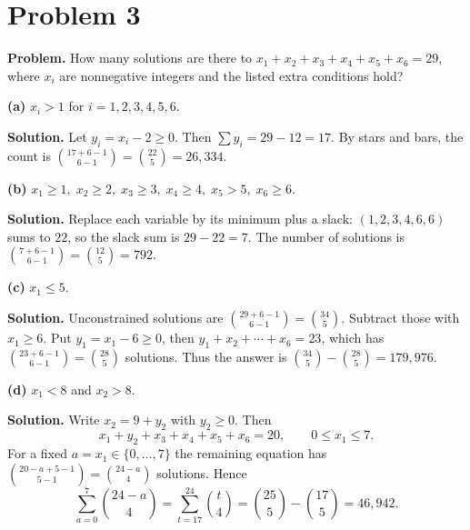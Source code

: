 \section*{Problem 3}
\textbf{Problem.} How many solutions are there to
\(x_1+x_2+x_3+x_4+x_5+x_6=29\),
where \(x_i\) are nonnegative integers and the listed extra conditions hold?

\medskip
\textbf{(a)} \(x_i>1\) for \(i=1,2,3,4,5,6\).

\textbf{Solution.}
Let \(y_i=x_i-2\ge 0\). Then \(\sum y_i=29-12=17\).
By stars and bars, the count is
\(\binom{17+6-1}{6-1}=\boxed{\binom{22}{5}=26{,}334}\).

\medskip
\textbf{(b)} \(x_1\ge 1,\;x_2\ge 2,\;x_3\ge 3,\;x_4\ge 4,\;x_5>5,\;x_6\ge 6.\)

\textbf{Solution.}
Replace each variable by its minimum plus a slack:
\((1,2,3,4,6,6)\) sums to \(22\), so the slack sum is \(29-22=7\).
The number of solutions is
\(\binom{7+6-1}{6-1}=\boxed{\binom{12}{5}=792}\).

\medskip
\textbf{(c)} \(x_1\le 5\).

\textbf{Solution.}
Unconstrained solutions are \(\binom{29+6-1}{6-1}=\binom{34}{5}\).
Subtract those with \(x_1\ge 6\). Put \(y_1=x_1-6\ge 0\), then
\(y_1+x_2+\cdots+x_6=23\), which has \(\binom{23+6-1}{6-1}=\binom{28}{5}\) solutions.
Thus the answer is
\(\boxed{\binom{34}{5}-\binom{28}{5}=179{,}976}\).

\medskip
\textbf{(d)} \(x_1<8\) and \(x_2>8\).

\textbf{Solution.}
Write \(x_2=9+y_2\) with \(y_2\ge 0\). Then
\[
x_1+y_2+x_3+x_4+x_5+x_6=20,\qquad 0\le x_1\le 7.
\]
For a fixed \(a=x_1\in\{0,\dots,7\}\) the remaining equation has
\(\binom{20-a+5-1}{5-1}=\binom{24-a}{4}\) solutions. Hence
\[
\sum_{a=0}^{7}\binom{24-a}{4}
= \sum_{t=17}^{24}\binom{t}{4}
= \binom{25}{5}-\binom{17}{5}
= \boxed{46{,}942}.
\]
